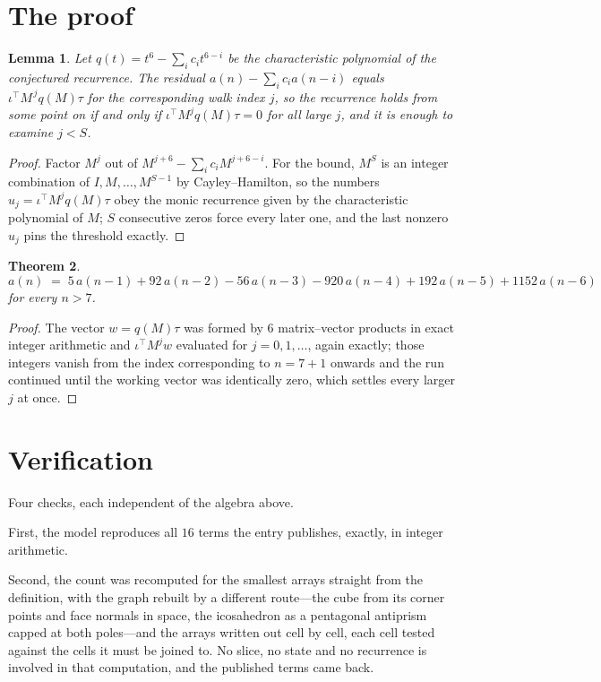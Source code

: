 \documentclass[11pt,a4paper]{article}
\theoremstyle{plain}
\newtheorem{theorem}{Theorem}
\newtheorem{lemma}[theorem]{Lemma}
\theoremstyle{definition}
\begin{document}
\section{The proof}

\begin{lemma}\label{lem:crit}
Let $q(t)=t^{6}-\sum_i c_it^{6-i}$ be the characteristic polynomial of the
conjectured recurrence. The residual $a(n)-\sum_ic_ia(n-i)$ equals
$\iota^{\!\top}M^{\,j}q(M)\tau$ for the corresponding walk index $j$, so the recurrence
holds from some point on if and only if $\iota^{\!\top}M^{j}q(M)\tau=0$ for all large $j$,
and it is enough to examine $j<S$.
\end{lemma}

\begin{proof}
Factor $M^{j}$ out of $M^{j+6}-\sum_ic_iM^{j+6-i}$. For the bound, $M^{S}$
is an integer combination of $I,M,\dots,M^{S-1}$ by Cayley--Hamilton, so the numbers
$u_j=\iota^{\!\top}M^{j}q(M)\tau$ obey the monic recurrence given by the characteristic
polynomial of $M$; $S$ consecutive zeros force every later one, and the last nonzero $u_j$
pins the threshold exactly.
\end{proof}

\begin{theorem}
\[
a(n)\;=\;5\,a(n-1) + 92\,a(n-2) - 56\,a(n-3) - 920\,a(n-4) + 192\,a(n-5) + 1152\,a(n-6)
\]
for every $n>7$.
\end{theorem}

\begin{proof}
The vector $w=q(M)\tau$ was formed by $6$ matrix--vector products in exact integer
arithmetic and $\iota^{\!\top}M^{j}w$ evaluated for $j=0,1,\dots$, again exactly; those
integers vanish from the index corresponding to $n=7+1$ onwards and the run continued
until the working vector was identically zero, which settles every larger $j$ at once.
\end{proof}

\section{Verification}

Four checks, each independent of the algebra above.

First, the model reproduces all $16$ terms the entry publishes, exactly, in integer
arithmetic.

Second, the count was recomputed for the smallest arrays straight from the definition, with the
graph rebuilt by a different route---the cube from its corner points and face normals in space,
the icosahedron as a pentagonal antiprism capped at both poles---and the arrays written out cell
by cell, each cell tested against the cells it must be joined to. No slice, no state and no
recurrence is involved in that computation, and the published terms came back.
\end{document}
